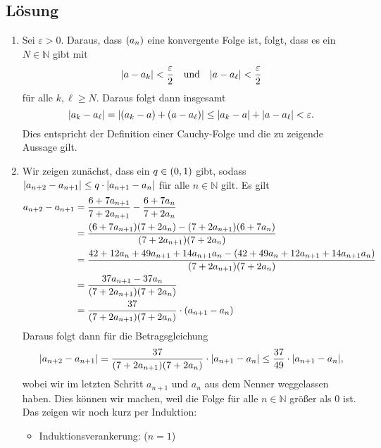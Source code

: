\documentclass[german,12pt]{homework}
\newcommand{\NN}{\mathbb{N}}
\DeclarePairedDelimiter{\absolute}{\lvert}{\rvert}
\DeclarePairedDelimiter{\enbrace}{(}{)}
\begin{document}
    \subsection*{Lösung}
    \begin{enumerate}
        \item Sei \(\varepsilon > 0\). Daraus, dass \(\enbrace*{a_n}\) eine konvergente Folge ist, folgt, dass es ein \(N \in \NN\) gibt mit
        \[\absolute*{a - a_k} < \frac{\varepsilon}{2} \quad \text{und} \quad \absolute*{a - a_\ell} < \frac{\varepsilon}{2}\]
        für alle \(k, \ell \ge N\). Daraus folgt dann insgesamt
        \[\absolute*{a_k - a_\ell} = \absolute*{\enbrace*{a_k - a} + \enbrace*{a - a_\ell}} \le \absolute*{a_k - a} + \absolute*{a - a_\ell} < \varepsilon.\]
        Dies entspricht der Definition einer Cauchy-Folge und die zu zeigende Aussage gilt.
        \item Wir zeigen zunächst, dass ein \(q \in \enbrace*{0, 1}\) gibt, sodass \(\absolute*{a_{n + 2} - a_{n + 1}} \le q \cdot \absolute*{a_{n + 1} - a_n}\) für alle \(n \in \NN\) gilt. Es gilt
        \begin{align*}
            a_{n + 2} - a_{n + 1} &= \frac{6 + 7a_{n + 1}}{7 + 2a_{n + 1}} - \frac{6 + 7a_n}{7 + 2a_n}\\
            &= \frac{\enbrace*{6 + 7a_{n + 1}}\enbrace*{7 + 2a_n} - \enbrace*{7 + 2a_{n + 1}}\enbrace*{6 + 7a_n}}{\enbrace*{7 + 2a_{n + 1}}\enbrace*{7 + 2a_n}}\\
            &= \frac{42 + 12a_n + 49a_{n + 1} + 14a_{n + 1}a_n - \enbrace*{42 + 49a_n + 12a_{n + 1} + 14a_{n + 1}a_n}}{\enbrace*{7 + 2a_{n + 1}}\enbrace*{7 + 2a_n}}\\
            &= \frac{37a_{n + 1} - 37a_n}{\enbrace*{7 + 2a_{n + 1}}\enbrace*{7 + 2a_n}}\\
            &= \frac{37}{\enbrace*{7 + 2a_{n + 1}}\enbrace*{7 + 2a_n}} \cdot \enbrace*{a_{n + 1} - a_n}
        \end{align*}
        Daraus folgt dann für die Betragsgleichung
        \[\absolute*{a_{n + 2}- a_{n + 1}} = \frac{37}{\enbrace*{7 + 2a_{n + 1}}\enbrace*{7 + 2a_n}} \cdot \absolute*{a_{n + 1} - a_n} \le \frac{37}{49} \cdot \absolute*{a_{n + 1} - a_n},\]
        wobei wir im letzten Schritt \(a_{n + 1}\) und \(a_n\) aus dem Nenner weggelassen haben. Dies können wir machen, weil die Folge für alle \(n \in \NN\) größer als \(0\) ist. Das zeigen wir noch kurz per Induktion:
        \begin{itemize}
            \item Induktionsverankerung: (\(n = 1\))

\end{itemize}
\end{enumerate}
\end{document}
